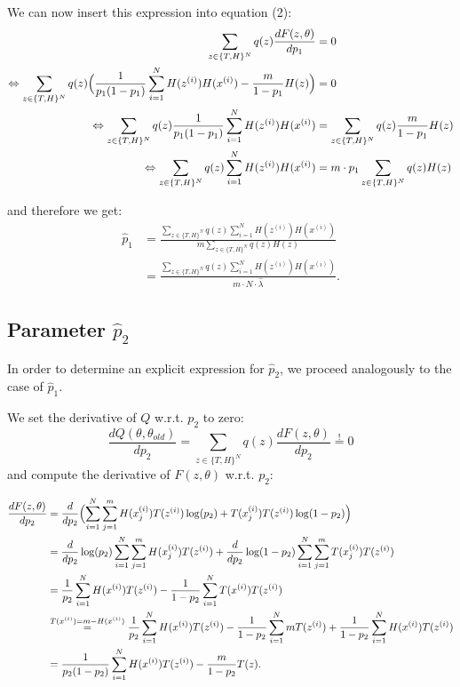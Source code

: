 \documentclass[10pt,a4paper]{article}
\begin{document}
We can now insert this expression into equation (2):
\begin{align*}
\sum_{z\in \{T,H\}^N} q(z) \frac{dF(z,\theta)}{d p_1} &=0\\
\Leftrightarrow \sum_{z\in \{T,H\}^N} q(z)\Bigl ( \frac{1}{p_1(1-p_1)} \sum_{i=1}^N  H(z^{(i)}) H(x^{(i)}) - \frac{m}{1-p_1} H(z) \Bigr) &=0\\
\Leftrightarrow \sum_{z\in \{T,H\}^N} q(z) \frac{1}{p_1(1-p_1)} \sum_{i=1}^N  H(z^{(i)}) H(x^{(i)}) &=\sum_{z\in \{T,H\}^N} q(z) \frac{m}{1-p_1} H(z)\\
\Leftrightarrow \sum_{z\in \{T,H\}^N} q(z) \sum_{i=1}^N  H(z^{(i)}) H(x^{(i)}) &=m \cdot p_1 \sum_{z\in \{T,H\}^N} q(z) H(z)
\end{align*}
 
 and therefore we get:
 \begin{align*}
 \hat p_1 &=\frac{ \sum_{z\in \{T,H\}^N} q(z) \sum_{i=1}^N  H(z^{(i)}) H(x^{(i)})}{m\sum_{z\in \{T,H\}^N} q(z) H(z)}\\
 &=\frac{ \sum_{z\in \{T,H\}^N} q(z) \sum_{i=1}^N  H(z^{(i)}) H(x^{(i)})}{m \cdot N  \cdot \hat \lambda}.
 \end{align*}

\subsection*{Parameter $\hat p_2$}

In order to determine an explicit expression for $\hat p_2$, we proceed analogously to the case of $\hat p_1$.

We set the derivative of $Q$ w.r.t. $p_2$ to zero:
\begin{equation}\label{derQp2}
\frac{dQ(\theta,\theta_{old})}{d p_2}=\sum_{z\in \{T,H\}^N} q(z) \frac{dF(z,\theta)}{d p_2} \stackrel{!}{=}0
\end{equation}
and compute the derivative of $F(z,\theta)$ w.r.t. $p_2$:

\begin{align*}
\frac{dF(z,\theta)}{d p_2} &= \frac{d}{d p_2} \Bigl ( \sum_{i=1}^N \sum_{j=1}^m  H(x_j^{(i)})T(z^{(i)}) \log(p_2)+ T(x_j^{(i)})T(z^{(i)}) \log (1-p_2) \Bigr )\\
&= \frac{d}{d p_2} \log(p_2)\sum_{i=1}^N \sum_{j=1}^m  H(x_j^{(i)})T(z^{(i)}) +  \frac{d}{d p_2} \log (1-p_2) \sum_{i=1}^N \sum_{j=1}^m T(x_j^{(i)})T(z^{(i)})  \\
&= \frac{1}{p_2}\sum_{i=1}^N  H(x^{(i)})T(z^{(i)}) -  \frac{1}{1- p_2}\sum_{i=1}^N  T(x^{(i)})T(z^{(i)})  \\
&\stackrel{T(x^{(i)})=m-H(x^{(i)})}{=} \frac{1}{p_2}\sum_{i=1}^N  H(x^{(i)})T(z^{(i)}) -  \frac{1}{1- p_2}\sum_{i=1}^N  m T(z^{(i)}) + \frac{1}{1- p_2}\sum_{i=1}^N H(x^{(i)})T(z^{(i)}) \\
&= \frac{1}{p_2(1-p_2)}\sum_{i=1}^N  H(x^{(i)})T(z^{(i)}) -  \frac{m}{1- p_2} T(z).
\end{align*}
\end{document}
